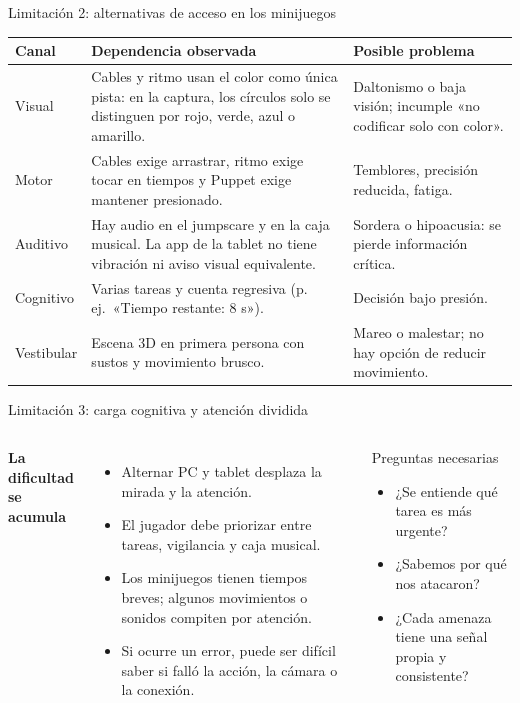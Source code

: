 \documentclass[aspectratio=169,11pt]{beamer}
\newcommand{\tagline}[1]{{\color{Teal}\bfseries\small #1}}
\begin{document}
\begin{frame}{Limitación 2: alternativas de acceso en los minijuegos}
  \footnotesize
  \begin{tabular}{>{\RaggedRight\arraybackslash}p{.13\linewidth} >{\RaggedRight\arraybackslash}p{.38\linewidth} >{\RaggedRight\arraybackslash}p{.40\linewidth}}
    \toprule
    \textbf{Canal} & \textbf{Dependencia observada} & \textbf{Posible problema}\\
    \midrule
    Visual & Cables y ritmo usan el color como única pista: en la captura, los círculos solo se distinguen por rojo, verde, azul o amarillo. & Daltonismo o baja visión; incumple «no codificar solo con color».\\[.3em]
    Motor & Cables exige arrastrar, ritmo exige tocar en tiempos y Puppet exige mantener presionado. & Temblores, precisión reducida, fatiga.\\[.3em]
    Auditivo & Hay audio en el jumpscare y en la caja musical. La app de la tablet no tiene vibración ni aviso visual equivalente. & Sordera o hipoacusia: se pierde información crítica.\\[.3em]
    Cognitivo & Varias tareas y cuenta regresiva (p.\,ej.\ «Tiempo restante: 8 s»). & Decisión bajo presión.\\[.3em]
    Vestibular & Escena 3D en primera persona con sustos y movimiento brusco. & Mareo o malestar; no hay opción de reducir movimiento.\\
    \bottomrule
  \end{tabular}
\end{frame}

\begin{frame}{Limitación 3: carga cognitiva y atención dividida}
  \begin{columns}[T,onlytextwidth]
      \tagline{La dificultad se acumula}
      \begin{itemize}
        \item Alternar PC y tablet desplaza la mirada y la atención.
        \item El jugador debe priorizar entre tareas, vigilancia y caja musical.
        \item Los minijuegos tienen tiempos breves; algunos movimientos o sonidos compiten por atención.
        \item Si ocurre un error, puede ser difícil saber si falló la acción, la cámara o la conexión.
      \end{itemize}
      \begin{block}{Preguntas necesarias}
        \begin{itemize}
          \item ¿Se entiende qué tarea es más urgente?
          \item ¿Sabemos por qué nos atacaron?
          \item ¿Cada amenaza tiene una señal propia y consistente?
        \end{itemize}
      \end{block}
  \end{columns}
\end{frame}
\end{document}
